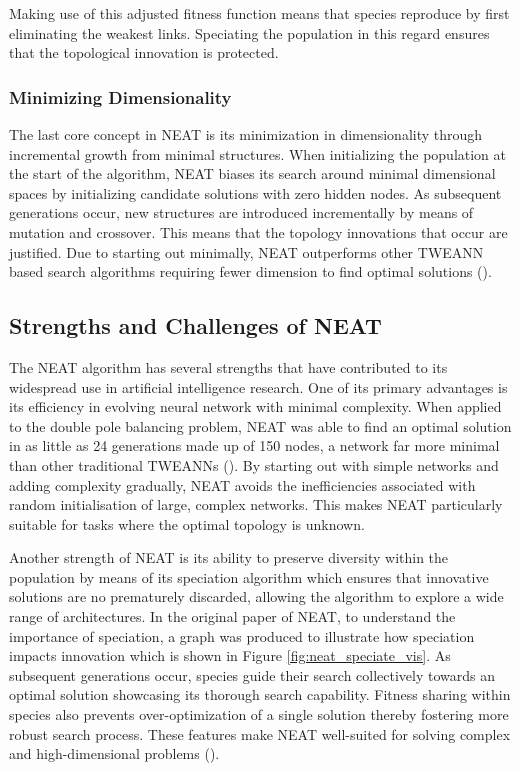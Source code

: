 \parbreak\noindent Making use of this adjusted fitness function means that species reproduce by first eliminating the weakest links. Speciating the population in this regard ensures that the topological innovation is protected.

\subsubsection{Minimizing Dimensionality}
The last core concept in NEAT is its minimization in dimensionality through incremental growth from minimal structures. When initializing the population at the start of the algorithm, NEAT biases its search around minimal dimensional spaces by initializing candidate solutions with zero hidden nodes. As subsequent generations occur, new structures are introduced incrementally by means of mutation and crossover. This means that the topology innovations that occur are justified. Due to starting out minimally, NEAT outperforms other TWEANN based search algorithms requiring fewer dimension to find optimal solutions (\cite{stanley2002evolving}).

\subsection{Strengths and Challenges of NEAT}
The NEAT algorithm has several strengths that have contributed to its widespread use in artificial intelligence research. One of its primary advantages is its efficiency in evolving neural network with minimal complexity. When applied to the double pole balancing problem, NEAT was able to find an optimal solution in as little as 24 generations made up of 150 nodes, a network far more minimal than other traditional TWEANNs (\cite{stanley2002evolving}). By starting out with simple networks and adding complexity gradually, NEAT avoids the inefficiencies associated with random initialisation of large, complex networks. This makes NEAT particularly suitable for tasks where the optimal topology is unknown.

\parbreak\noindent Another strength of NEAT is its ability to preserve diversity within the population by means of its speciation algorithm which ensures that innovative solutions are no prematurely discarded, allowing the algorithm to explore a wide range of architectures. In the original paper of NEAT, to understand the importance of speciation, a graph was produced to illustrate how speciation impacts innovation which is shown in Figure \ref{fig:neat_speciate_vis}. As subsequent generations occur, species guide their search collectively towards an optimal solution showcasing its thorough search capability. Fitness sharing within species also prevents over-optimization of a single solution thereby fostering more robust search process. These features make NEAT well-suited for solving complex and high-dimensional problems (\cite{stanley2002evolving}). 

